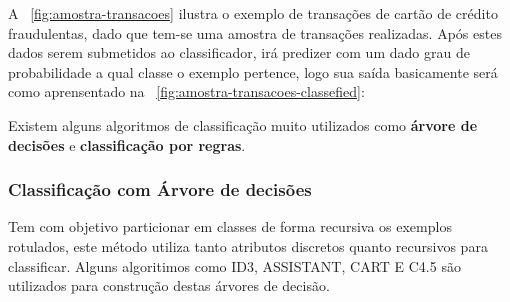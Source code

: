A ~\autoref{fig:amostra-transacoes} ilustra o exemplo de transações de cartão de crédito fraudulentas, dado que tem-se uma 
amostra de transações realizadas. Após estes dados serem submetidos ao classificador, irá predizer com um dado grau de probabilidade 
a qual classe o exemplo pertence, logo sua saída basicamente será como aprensentado na ~\autoref{fig:amostra-transacoes-classefied}:
\begin{figure}[ht!]
	\centering
\end{figure}
\begin{figure}[ht!]
	\centering
\end{figure}

Existem alguns algoritmos de classificação muito utilizados como  \textbf{árvore de decisões} e \textbf{classificação por regras}.


\subsubsection{Classificação com Árvore de decisões}
\label{subsubsec:decision-tree}
Tem com objetivo particionar em classes de forma recursiva os exemplos rotulados, este método
utiliza tanto atributos discretos quanto recursivos para classificar. Alguns algoritimos como ID3, ASSISTANT, CART E C4.5 
são utilizados para construção destas árvores de decisão.

